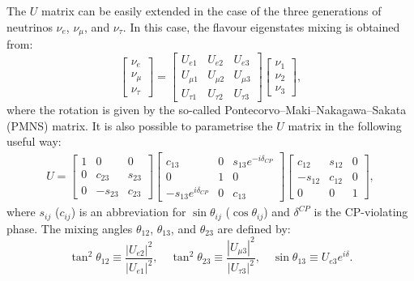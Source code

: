 The $U$ matrix can be easily extended in the case of the three generations of neutrinos $\nu_{e}$, $\nu_{\mu}$, and $\nu_{\tau}$. In this case, the flavour eigenstates mixing is obtained from:
\begin{equation}
\begin{bmatrix}
\nu_{e}\\
\nu_{\mu}\\
\nu_{\tau}
\end{bmatrix}=
\begin{bmatrix} U_{e 1} & U_{e 2} & U_{e 3} \\ U_{\mu 1} & U_{\mu 2} & U_{\mu 3} \\ U_{\tau 1} & U_{\tau 2} & U_{\tau 3} 
\end{bmatrix} 
\begin{bmatrix} \nu_1 \\ \nu_2 \\ \nu_3 \end{bmatrix},
\end{equation}
where the rotation is given by the so-called Pontecorvo–Maki–Nakagawa–Sakata (PMNS) matrix. It is also possible to parametrise the $U$ matrix in the following useful way:
\begin{align} 
  U =  \begin{bmatrix} 1 & 0 & 0 \\ 0 & c_{23} & s_{23} \\ 0 & -s_{23} & c_{23} \end{bmatrix}
 \begin{bmatrix} c_{13} & 0 & s_{13}e^{-i\delta_{CP}} \\ 0 & 1 & 0 \\ -s_{13}e^{i\delta_{CP}} & 0 & c_{13} \end{bmatrix}
 \begin{bmatrix} c_{12} & s_{12} & 0 \\ -s_{12} & c_{12} & 0 \\ 0 & 0 & 1 \end{bmatrix},
\end{align}
where  $s_{ij}$ ($c_{ij}$) is an abbreviation for $\sin\theta_{ij}$ ($\cos\theta_{ij}$) and $\delta^{CP}$ is the CP-violating phase. The mixing angles $\theta_{12}$, $\theta_{13}$, and $\theta_{23}$ are defined by:
\begin{equation}
    \tan^2\theta_{12}\equiv\frac{|U_{e2}|^2}{|U_{e1}|^2},\quad
    \tan^2\theta_{23}\equiv\frac{|U_{\mu3}|^2}{|U_{\tau3}|^2},\quad
    \sin\theta_{13}\equiv U_{e3}e^{i\delta}.
\end{equation}

